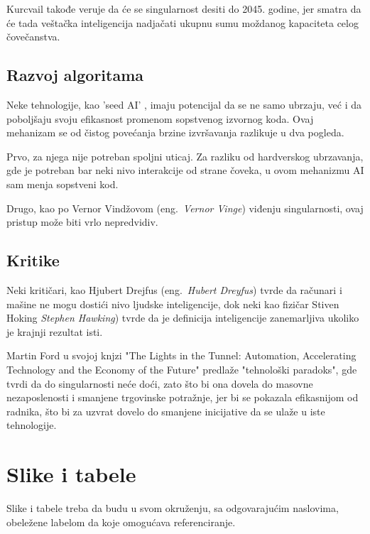\documentclass[a4paper]{article}
\begin{document}
Kurcvail takođe veruje da će se singularnost desiti do 2045. godine, jer smatra da će tada veštačka inteligencija nadjačati ukupnu sumu moždanog kapaciteta celog čovečanstva. \cite{mog-6}


\subsection{Razvoj algoritama}

Neke tehnologije, kao 'seed AI' \cite{mog-7}, imaju potencijal da se ne samo ubrzaju, već i da poboljšaju svoju efikasnost promenom sopstvenog izvornog koda. 
Ovaj mehanizam se od čistog povećanja brzine izvršavanja razlikuje u dva pogleda.

Prvo, za njega nije potreban spoljni uticaj. Za razliku od hardverskog ubrzavanja, gde je potreban bar neki nivo interakcije od strane čoveka, u ovom mehanizmu AI sam menja sopstveni kod.

Drugo, kao po Vernor Vindžovom (eng.~{\em Vernor Vinge}) viđenju singularnosti, ovaj pristup može biti vrlo nepredvidiv. \cite{mog-8}

\subsection{Kritike}

Neki kritičari, kao Hjubert Drejfus (eng.~{\em Hubert Dreyfus}) tvrde da računari i mašine ne mogu dostići nivo ljudske inteligencije, dok neki kao fizičar Stiven Hoking {\em Stephen Hawking}) tvrde da je definicija inteligencije zanemarljiva ukoliko je krajnji rezultat isti. \cite{mog-9}

Martin Ford u svojoj knjzi "The Lights in the Tunnel: Automation, Accelerating Technology and the Economy of the Future" predlaže "tehnološki paradoks", gde tvrdi da do singularnosti neće doći, zato što bi ona dovela do masovne nezaposlenosti i smanjene trgovinske potražnje, jer bi se pokazala efikasnijom od radnika, što bi za uzvrat dovelo do smanjene inicijative da se ulaže u iste tehnologije. \cite{mog-10}



\section{Slike i tabele}
\label{slike_i_tabele}

Slike i tabele treba da budu u svom okruženju, sa odgovarajućim naslovima, obeležene labelom da koje omogućava referenciranje. 
\end{document}
